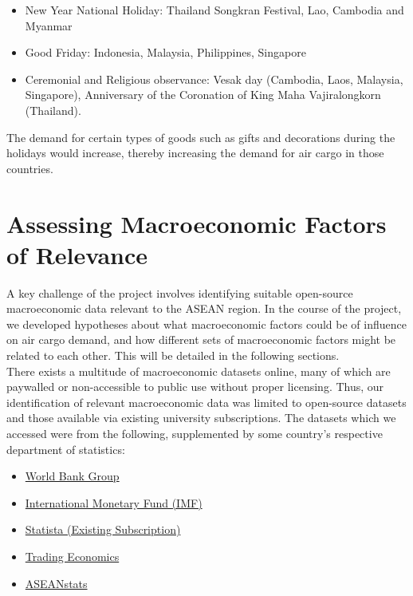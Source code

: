 \documentclass{article}
\begin{document}
\begin{itemize}
    \item New Year National Holiday: Thailand Songkran Festival, Lao, Cambodia and Myanmar
    \item Good Friday: Indonesia, Malaysia, Philippines, Singapore 
    \item Ceremonial and Religious observance: Vesak day (Cambodia, Laos, Malaysia, Singapore), Anniversary of the Coronation of King Maha Vajiralongkorn (Thailand).
\end{itemize} 

\noindent The demand for certain types of goods such as gifts and decorations during the holidays would increase, thereby increasing the demand for air cargo in those countries.

\newpage

\section{Assessing Macroeconomic Factors of Relevance}

A key challenge of the project involves identifying suitable open-source macroeconomic data relevant to the ASEAN region. In the course of the project, we developed hypotheses about what macroeconomic factors could be of influence on air cargo demand, and how different sets of macroeconomic factors might be related to each other. This will be detailed in the following sections. \\

\noindent There exists a multitude of macroeconomic datasets online, many of which are paywalled or non-accessible to public use without proper licensing. Thus, our identification of relevant macroeconomic data was limited to open-source datasets and those available via existing university subscriptions. The datasets which we accessed were from the following, supplemented by some country's respective department of statistics:

\begin{itemize}
    \item \href{https://data.worldbank.org/}{World Bank Group} 
    \item \href{https://data.imf.org}{International Monetary Fund (IMF)}
    \item \href{https://statista.com}{Statista (Existing Subscription)}
    \item \href{https://tradingeconomics.com/}{Trading Economics}
    \item \href{https://www.aseanstats.org/}{ASEANstats}
\end{itemize} 
\end{document}
